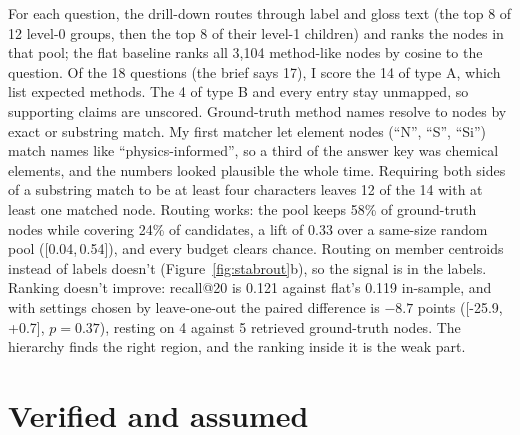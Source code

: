 \documentclass[10pt,a4paper]{article}
\newcommand{\code}[1]{\texttt{\small\detokenize{#1}}}
\newcommand{\ci}[2]{[#1,\,#2]}
\begin{document}
For each question, the drill-down routes through label and gloss text (the top 8 of 12 level-0 groups,
then the top 8 of their level-1 children) and ranks the nodes in that pool; the flat baseline ranks all
3,104 method-like nodes by cosine to the question. Of the 18 questions (the brief says 17), I score
the 14 of type A, which list expected methods. The 4 of type B and every \code{method_claims} entry stay
unmapped, so supporting claims are unscored. Ground-truth method names resolve to nodes by exact or
substring match. My first matcher let element nodes (``N'', ``S'', ``Si'') match names like
``physics-informed'', so a third of the answer key was chemical elements, and the numbers looked plausible
the whole time. Requiring both sides of a substring match to be at least four characters leaves 12
of the 14 with at least one matched node. Routing works: the pool keeps 58\% of ground-truth nodes while
covering 24\% of candidates, a lift of 0.33 over a same-size random pool (\ci{0.04}{0.54}), and every
budget clears chance. Routing on member centroids instead of labels doesn't (Figure~\ref{fig:stabrout}b),
so the signal is in the labels. Ranking doesn't improve: recall@20 is 0.121 against flat's 0.119
in-sample, and with settings chosen by leave-one-out the paired difference is $-8.7$ points
(\ci{-25.9}{+0.7}, $p = 0.37$), resting on 4 against 5 retrieved ground-truth nodes. The hierarchy finds
the right region, and the ranking inside it is the weak part.

\section{Verified and assumed}
\end{document}
